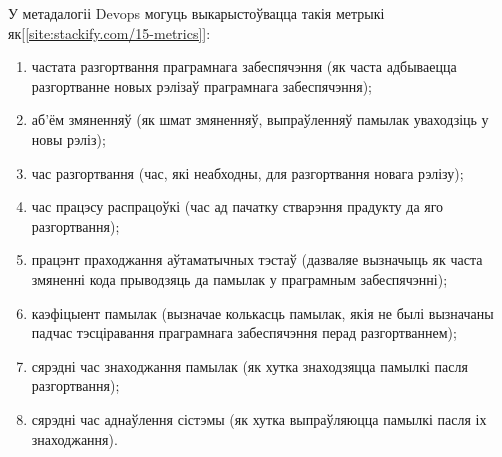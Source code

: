 У метадалогіі Devops могуць выкарыстоўвацца
такія метрыкі як[\ref{site:stackify.com/15-metrics}]:
\begin{enumerate}
    \item частата разгортвання праграмнага забеспячэння
          (як часта адбываецца разгортванне
           новых рэлізаў праграмнага забеспячэння);
    \item аб'ём змяненняў (як шмат змяненняў, выпраўленняў памылак
          уваходзіць у новы рэліз);
    \item час разгортвання (час, які неабходны, для
          разгортвання новага рэлізу);
    \item час працэсу распрацоўкі (час ад пачатку
          стварэння прадукту да яго разгортвання);
    \item працэнт праходжання аўтаматычных тэстаў
          (дазваляе вызначыць як часта змяненні кода
           прыводзяць да памылак у праграмным забеспячэнні);
    \item каэфіцыент памылак (вызначае колькасць памылак,
          якія не былі вызначаны падчас тэсціравання
          праграмнага забеспячэння перад разгортваннем);
    \item сярэдні час знаходжання памылак (як хутка
          знаходзяцца памылкі пасля разгортвання);
    \item сярэдні час аднаўлення сістэмы (як хутка
          выпраўляюцца памылкі пасля іх знаходжання).
\end{enumerate}
%
%
%
%
%
